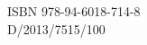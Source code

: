 \vspace*{0.2cm}
\begin{flushleft}
ISBN 978-94-6018-714-8\\
D/2013/7515/100\\
\end{flushleft}


\pagestyle{empty}
\newpage




